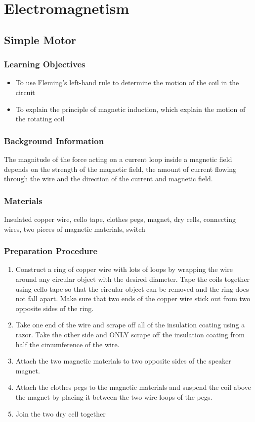\section{Electromagnetism}

\subsection{Simple Motor}

\subsubsection*{Learning Objectives}
\begin{itemize}
\item{To use Fleming's left-hand rule to determine the motion of the coil in the circuit} 
\item{To explain the principle of magnetic induction, which explain the motion of the rotating coil} 
\end{itemize}

\subsubsection*{Background Information}
The magnitude of the force acting on a current loop inside a magnetic field depends on the strength of the magnetic field, the amount of current flowing through the wire and the direction of the current and magnetic field.  

\subsubsection*{Materials}
Insulated copper wire, cello tape, clothes pegs, magnet, dry cells, connecting wires, two pieces of magnetic materials, switch

\subsubsection*{Preparation Procedure}
\begin{enumerate}
\item{Construct a ring of copper wire with lots of loops by wrapping the wire around any circular object with the desired diameter. Tape the coils together using cello tape so that the circular object can be removed and the ring does not fall apart. Make sure that two ends of the copper wire stick out from two opposite sides of the ring.} 
\item{ Take one end of the wire and scrape off all of the insulation coating using a razor. Take the other side and ONLY scrape off the insulation coating from half the circumference of the wire.} 
\item{Attach the two magnetic materials to two opposite sides of the speaker magnet.} 
\item{Attach the clothes pegs to the magnetic materials and suspend the coil above the magnet by placing it between the two wire loops of the pegs.} 
\item{Join the two dry cell together}
\end{enumerate}

